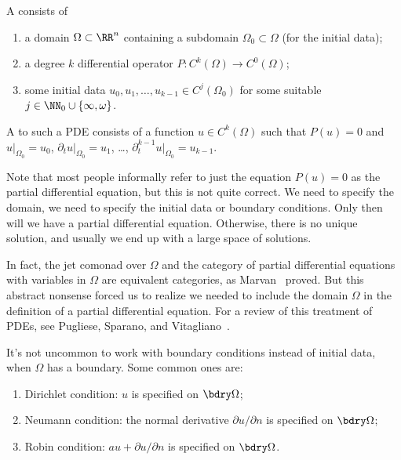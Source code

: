 \begin{definition}\label{pde-000D}%
A  consists of
\begin{enumerate}
\item a domain $\Omega\subset\RR^{n}$ containing a subdomain
  $\Omega_{0}\subset\Omega$ (for the initial data);
\item a degree $k$ differential operator $P\colon C^{k}(\Omega)\to C^{0}(\Omega)$;
\item some initial data $u_{0},u_{1},\dots,u_{k-1}\in C^{j}(\Omega_{0})$ for some suitable
  $j\in\NN_{0}\cup\{\infty,\omega\}$.
\end{enumerate}
A  to such a PDE consists of a function $u\in C^{k}(\Omega)$
such that $P(u)=0$ and $u|_{\Omega_{0}}=u_{0}$, $\partial_{t}u|_{\Omega_{0}}=u_{1}$,
\dots, $\partial_{t}^{k-1}u|_{\Omega_{0}}=u_{k-1}$.

\begin{node}\label{pde-000F}%
Note that most people informally refer to just the equation $P(u)=0$ as the
partial differential equation, but this is not quite correct. We need to
specify the domain, we need to specify the initial data or boundary
conditions. Only then will we have a partial differential equation.
Otherwise, there is no unique solution, and usually we end up with a
large space of solutions.

In fact, the jet comonad over $\Omega$ and the category of partial
differential equations with variables in $\Omega$ are equivalent
categories, as Marvan~\cite{marvan1986note} proved. But this abstract
nonsense forced us to realize we needed to include the domain $\Omega$
in the definition of a partial differential equation. For a review of
this treatment of PDEs, see Pugliese, Sparano, and
Vitagliano~\cite{pugliese2023vinogradovs}. 
\end{node}

\begin{node}\label{pde-000E}%
It's not uncommon to work with boundary conditions instead of initial
data, when $\Omega$ has a boundary.
Some common ones are:
\begin{enumerate}
\item Dirichlet condition: $u$ is specified on $\bdry\Omega$;
\item Neumann condition: the normal derivative $\partial u/\partial n$ 
  is specified on $\bdry\Omega$;
\item Robin condition: $au+\partial u/\partial n$ is specified on $\bdry\Omega$.
\end{enumerate}
\end{node}
\end{definition}

